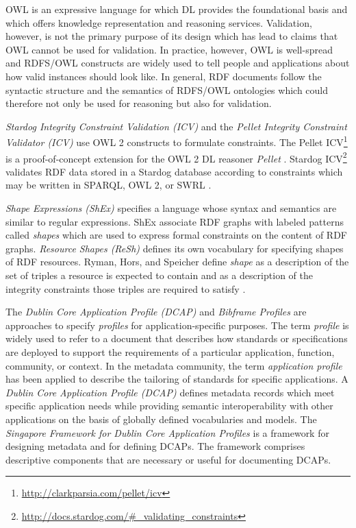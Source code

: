 \documentclass[a4paper,fontsize=11pt]{scrartcl}
\begin{document}
OWL is an expressive language for which DL provides the foundational basis and which offers knowledge representation and reasoning services. Validation, however, is not the primary purpose of its design which has lead to claims that OWL cannot be used for validation. In practice, however, OWL is well-spread and RDFS/OWL constructs are widely used to tell people and applications about how valid instances should look like. In general, RDF documents follow the syntactic structure and the semantics of RDFS/OWL ontologies which could therefore not only be used for reasoning but also for validation.

\emph{Stardog Integrity Constraint Validation (ICV)} and the \emph{Pellet Integrity Constraint Validator (ICV)} use OWL 2 constructs to formulate constraints. The Pellet ICV\footnote{\url{http://clarkparsia.com/pellet/icv}} is a proof-of-concept extension for the OWL 2 DL reasoner \emph{Pellet} \cite{sirin2007pellet}. Stardog ICV\footnote{\url{http://docs.stardog.com/#_validating_constraints}} validates RDF data stored in a Stardog database according to constraints which may be written in SPARQL, OWL 2, or SWRL \cite{Horrocks04}. 

\emph{Shape Expressions (ShEx)} \cite{W3C-ShEx-Primer-2014,W3C-ShEx-Definition-2014,Prud'hommeaux-2014,Boneva-2014} specifies a language whose syntax and semantics are similar to regular expressions. ShEx associate RDF graphs with labeled patterns called \emph{shapes} which are used to express formal constraints on the content of RDF graphs. \emph{Resource Shapes (ReSh)} \cite{W3C-ReSh-2014} defines its own vocabulary for specifying shapes of RDF resources. Ryman, Hors, and Speicher define \emph{shape} as a description of the set of triples a resource is expected to contain and as a description of the integrity constraints those triples are required to satisfy \cite{Ryman2013}. 

The \emph{Dublin Core Application Profile (DCAP)} and \emph{Bibframe Profiles} are approaches to specify \emph{profiles} for application-specific purposes. The term \emph{profile} is widely used to refer to a document that describes how standards or specifications are deployed to support the requirements of a particular application, function, community, or context. In the metadata community, the term \emph{application profile} has been applied to describe the tailoring of standards for specific applications. A \emph{Dublin Core Application Profile (DCAP)} \cite{DCMI-DCAP-2009} defines metadata records which meet specific application needs while providing semantic interoperability with other applications on the basis of globally defined vocabularies and models. The \emph{Singapore Framework for Dublin Core Application Profiles} \cite{DCMI-Singapore-2008} is a framework for designing metadata and for defining DCAPs. The framework comprises descriptive components that are necessary or useful for documenting DCAPs.
\end{document}
